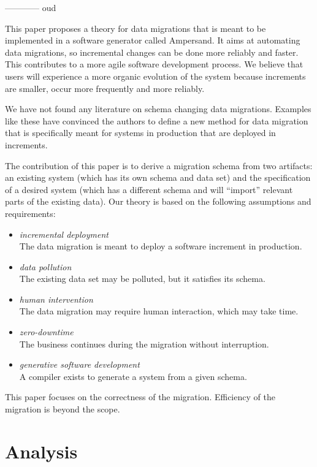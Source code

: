 \documentclass[runningheads]{llncs}
\begin{document}
------------
oud

   This paper proposes a theory for data migrations that is meant to be implemented in a software generator called Ampersand.
   It aims at automating data migrations, so incremental changes can be done more reliably and faster.
   This contributes to a more agile software development process.
   We believe that users will experience a more organic evolution of the system because increments are smaller, occur more frequently and more reliably.
      
   We have not found any literature on schema changing data migrations.
   Examples like these have convinced the authors to define a new method for data migration that is specifically meant for systems in production that are
   deployed in increments.
   
   The contribution of this paper is to derive a migration schema from two artifacts: an existing system
   (which has its own schema and data set) and the specification of a desired system (which has a different schema and will ``import'' relevant parts of the existing data).   
   Our theory is based on the following assumptions and requirements:
\begin{itemize}
   \item {\em incremental deployment}\\The data migration is meant to deploy a software increment in production.
   \item {\em data pollution}\\The existing data set may be polluted, but it satisfies its schema.
   \item {\em human intervention}\\The data migration may require human interaction, which may take time.
   \item {\em zero-downtime}\\The business continues during the migration without interruption.
   \item {\em generative software development}\\A compiler exists to generate a system from a given schema.
\end{itemize}
   This paper focuses on the correctness of the migration.
   Efficiency of the migration is beyond the scope.

\section{Analysis}
\label{sct:Analysis}
\end{document}
